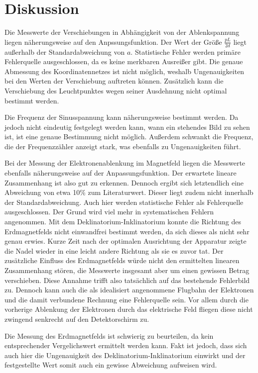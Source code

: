 \section{Diskussion}
\label{sec:Diskussion}

Die Messwerte der Verschiebungen in Abhängigkeit von der Ablenkspannung liegen näherungsweise auf den Anpssungsfunktion.
Der Wert der Größe $\frac{pL}{2d}$ liegt außerhalb der Standardabweichung von $a$. Statistische Fehler
werden primäre Fehlerquelle ausgeschlossen, da es keine merkbaren Ausreißer gibt. Die genaue Abmessung
des Koordinatennetzes ist nicht möglich, weshalb Ungenauigkeiten bei den Werten der Verschiebung auftreten können.
Zusätzlich kann die Verschiebung des Leuchtpunktes wegen seiner Ausdehnung nicht optimal bestimmt werden.

Die Frequenz der Sinusspannung kann näherungsweise bestimmt werden. Da jedoch nicht eindeutig
festgelegt werden kann, wann ein stehendes Bild zu sehen ist, ist eine genaue Bestimmung nicht möglich.
Außerdem schwankt die Frequenz, die der Frequenzzähler anzeigt stark, was ebenfalls zu Ungenauigkeiten führt.

Bei der Messung der Elektronenablenkung im Magnetfeld liegen die Messwerte ebenfalls näherungsweise auf der Anpassungsfunktion.
Der erwartete lineare Zusammenhang ist also gut zu erkennen. Dennoch ergibt sich letztendlich eine Abweichung von etwa 10\% zum
Literaturwert. Dieser liegt zudem nicht innerhalb der Standardabweichung. Auch hier werden statistische Fehler als Fehlerquelle ausgeschlossen.
Der Grund wird viel mehr in systematischen Fehlern angenommen. Mit dem Deklinatorium-Inklinatorium konnte die Richtung des Erdmagnetfelds
nicht einwandfrei bestimmt werden, da sich dieses als nicht sehr genau erwies. Kurze Zeit nach der optimalen Ausrichtung der Apparatur
zeigte die Nadel wieder in eine leicht andere Richtung als sie es zuvor tat. Der zusätzliche Einfluss des Erdmagnetfelds würde nicht den
ermittelten linearen Zusammenhang stören, die Messwerte insgesamt aber um einen gewissen Betrag verschieben. Diese Annahme trifft also
tatsächlich auf das bestehende Fehlerbild zu. Dennoch kann auch die als idealisiert angenommene Flugbahn der Elektronen und die damit
verbundene Rechnung eine Fehlerquelle sein. Vor allem durch die vorherige Ablenkung der Elektronen durch das elektrische Feld fliegen
diese nicht zwingend senkrecht auf den Detektorschirm zu.

Die Messung des Erdmagnetfelds ist schwierig zu beurteilen, da kein entsprechender Vergelichswert ermittelt werden kann. Fakt ist jedoch, dass
sich auch hier die Ungenauigkeit des Deklinatorium-Inklinatorium einwirkt und der festgestellte Wert somit auch ein gewisse Abweichung aufweisen
wird.
